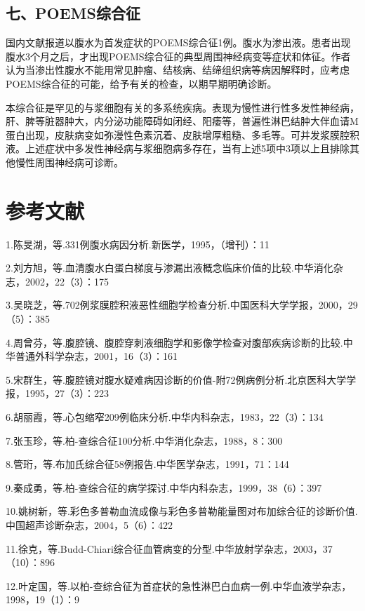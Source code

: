 \subsection{七、POEMS综合征}

国内文献报道以腹水为首发症状的POEMS综合征1例。腹水为渗出液。患者出现腹水3个月之后，才出现POEMS综合征的典型周围神经病变等症状和体征。作者认为当渗出性腹水不能用常见肿瘤、结核病、结缔组织病等病因解释时，应考虑POEMS综合征的可能，给予有关的检查，以期早期明确诊断。

本综合征是罕见的与浆细胞有关的多系统疾病。表现为慢性进行性多发性神经病，肝、脾等脏器肿大，内分泌功能障碍如闭经、阳痿等，普遍性淋巴结肿大伴血请M蛋白出现，皮肤病变如弥漫性色素沉着、皮肤增厚粗糙、多毛等。可并发浆膜腔积液。上述症状中多发性神经病与浆细胞病多存在，当有上述5项中3项以上且排除其他慢性周围神经病可诊断。

\protect\hypertarget{text00227.html}{}{}

\section{参考文献}

1.陈旻湖，等.331例腹水病因分析.新医学，1995，（增刊）：11

2.刘方旭，等.血清腹水白蛋白梯度与渗漏出液概念临床价值的比较.中华消化杂志，2002，22（3）：175

3.吴晓芝，等.702例浆膜腔积液恶性细胞学检查分析.中国医科大学学报，2000，29（5）：385

4.周曾芬，等.腹腔镜、腹腔穿刺液细胞学和影像学检查对腹部疾病诊断的比较.中华普通外科学杂志，2001，16（3）：161

5.宋群生，等.腹腔镜对腹水疑难病因诊断的价值-附72例病例分析.北京医科大学学报，1995，27（3）：223

6.胡丽霞，等.心包缩窄209例临床分析.中华内科杂志，1983，22（3）：134

7.张玉珍，等.柏-查综合征100分析.中华消化杂志，1988，8：300

8.管珩，等.布加氏综合征58例报告.中华医学杂志，1991，71：144

9.秦成勇，等.柏-查综合征的病学探讨.中华内科杂志，1999，38（6）：397

10.姚树新，等.彩色多普勒血流成像与彩色多普勒能量图对布加综合征的诊断价值.中国超声诊断杂志，2004，5（6）：422

11.徐克，等.Budd-Chiari综合征血管病变的分型.中华放射学杂志，2003，37（10）：896

12.叶定国，等.以柏-查综合征为首症状的急性淋巴白血病一例.中华血液学杂志，1998，19（1）：9

